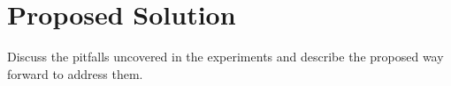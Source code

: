 \section{Proposed Solution}
\label{section:proposal}

Discuss the pitfalls uncovered in the experiments and describe the proposed way forward to address them.